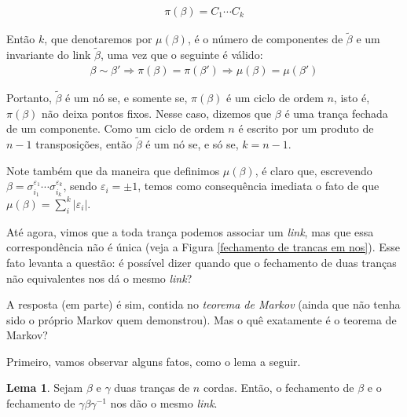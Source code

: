 \documentclass[a4paper,portuguese,11pt,twoside, leqno]{book}
\theoremstyle{definition}
\newtheorem{lemma}[theorem]{Lema}
\begin{document}
	\begin{align*}
	\pi(\beta) = C_1\cdots C_k
	\end{align*} 
	\par\vspace{0.3cm} Então $k$, que denotaremos por $\mu(\beta)$, é o número de componentes de $\widetilde{\beta}$ e um invariante do link $\widetilde{\beta}$, uma vez que o seguinte é válido:
	\begin{align*}
	\beta\sim\beta' \Rightarrow \pi(\beta) = \pi(\beta') \Rightarrow \mu(\beta) = \mu(\beta')
	\end{align*}
	\par\vspace{0.3cm} Portanto, $\widetilde{\beta}$ é um nó se, e somente se, $\pi(\beta)$ é um ciclo de ordem $n$, isto é, $\pi(\beta)$ não deixa pontos fixos. Nesse caso, dizemos que $\beta$ é uma trança fechada de um componente. Como um ciclo de ordem $n$ é escrito por um produto de $n-1$ transposições, então $\widetilde{\beta}$ é um nó se, e só se, $k = n-1$.
	\par\vspace{0.3cm} Note também que da maneira que definimos $\mu(\beta)$, é claro que, escrevendo $\beta = \sigma_{i_1}^{\varepsilon_1}\cdots\sigma_{i_k}^{\varepsilon_k}$, sendo $\varepsilon_i = \pm1$, temos como consequência imediata o fato de que $\mu(\beta) = \displaystyle{\sum_{i}^{k}|\varepsilon_i|}$. 
	\par\vspace{0.3cm} Até agora, vimos que a toda trança podemos associar um \textit{link}, mas que essa correspondência não é única (veja a Figura \eqref{fechamento de trancas em nos}). Esse fato levanta a questão: é possível dizer quando que o fechamento de duas tranças não equivalentes nos dá o mesmo \textit{link}? 
	\par\vspace{0.3cm} A resposta (em parte) é sim, contida no \textit{teorema de Markov} (ainda que não tenha sido o próprio Markov quem demonstrou). Mas o quê exatamente é o teorema de Markov?
	\par\vspace{0.3cm} Primeiro, vamos observar alguns fatos, como o lema a seguir.
	
	\begin{lemma}
		\label{conjugacoes dao o mesmo link}
		Sejam $\beta$ e $\gamma$ duas tranças de $n$ cordas. Então, o fechamento de $\beta$ e o fechamento de $\gamma\beta\gamma^{-1}$ nos dão o mesmo \textit{link}.
	\end{lemma}
	
\end{document}
